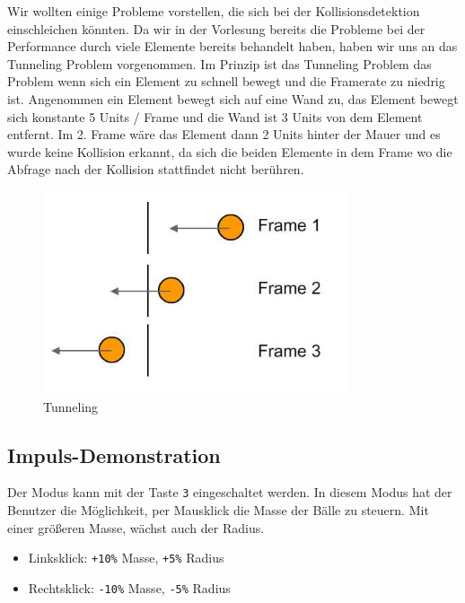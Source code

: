 \documentclass[12pt,a4paper]{article}
\begin{document}
	Wir wollten einige Probleme vorstellen, die sich bei der Kollisionsdetektion einschleichen könnten.
	Da wir in der Vorlesung bereits die Probleme bei der Performance durch viele Elemente bereits behandelt haben, haben wir uns an das Tunneling Problem \cite{tunneling_source} vorgenommen.
	\newline
	Im Prinzip ist das Tunneling Problem das Problem wenn sich ein Element zu schnell bewegt und die Framerate zu niedrig ist. Angenommen ein Element bewegt sich auf eine Wand zu, das Element bewegt sich konstante 5 Units / Frame und die Wand ist 3 Units von dem Element entfernt. Im 2. Frame wäre das Element dann 2 Units hinter der Mauer und es wurde keine Kollision erkannt, da sich die beiden Elemente in dem Frame wo die Abfrage nach der Kollision stattfindet nicht berühren.
	
	\begin{figure}[H]
		\centering 
		\includegraphics[width=0.8\textwidth]{tunneling.jpg}  
		\caption{Tunneling  \cite{tunneling_example}} 
		\label{Bild: Beispiel Tunneling}  
	\end{figure}
	
	
	\subsection{Impuls-Demonstration}
	
	Der Modus kann mit der Taste \texttt{3} eingeschaltet werden. 
	In diesem Modus hat der Benutzer die Möglichkeit, per Mausklick die Masse der Bälle zu steuern. 
	Mit einer größeren Masse, wächst auch der Radius. 
\begin{itemize}
	\item Linksklick: \texttt{+10\%} Masse, \texttt{+5\%} Radius  
	\item Rechtsklick: \texttt{-10\%} Masse, \texttt{-5\%} Radius  
\end{itemize}
\end{document}
